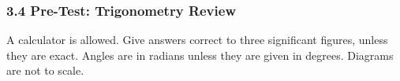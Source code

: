 \documentclass[12pt, twoside]{article}
\begin{document}
\subsubsection*{3.4 Pre-Test: Trigonometry Review}

A calculator is allowed. Give answers correct to three significant figures,
unless they are exact. Angles are in radians unless they are given in
degrees. Diagrams are not to scale.

\begin{center}
\end{center}
\end{document}
